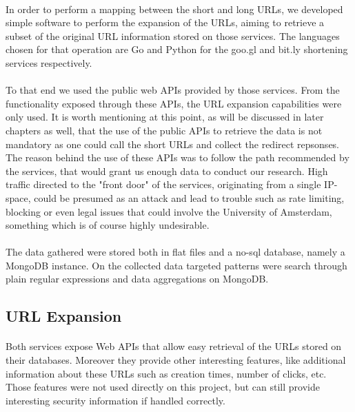 \documentclass[12pt]{article}
\begin{document}
\paragraph{}
In order to perform a mapping between the short and long URLs, we developed simple software to perform the expansion of the URLs, aiming to retrieve a subset of the original URL information stored on those services. The languages chosen for that operation are Go and Python for the goo.gl and bit.ly shortening services respectively. 

\paragraph{}
To that end we used the public web APIs provided by those services. From the functionality exposed through these APIs, the URL expansion capabilities were only used. It is worth mentioning at this point, as will be discussed in later chapters as well, that the use of the public APIs to retrieve the data is not mandatory as one could call the short URLs and collect the redirect repsonses. The reason behind the use of these APIs was to follow the path recommended by the services, that would grant us enough data to conduct our research. High traffic directed to the "front door" of the services, originating from a single IP-space, could be presumed as an attack and lead to trouble such as rate limiting, blocking or even legal issues that could involve the University of Amsterdam, something which is of course highly undesirable. 

\paragraph{}
The data gathered were stored both in flat files and a no-sql database, namely a MongoDB instance. On the collected data targeted patterns were search through plain regular expressions and data aggregations on MongoDB. 

\subsection{URL Expansion}

\paragraph{}
Both services expose Web APIs that allow easy retrieval of the URLs stored on their databases. Moreover they provide other interesting features, like additional information about these URLs such as creation times, number of clicks, etc. Those features were not used directly on this project, but can still provide interesting security information if handled correctly. 
\end{document}
